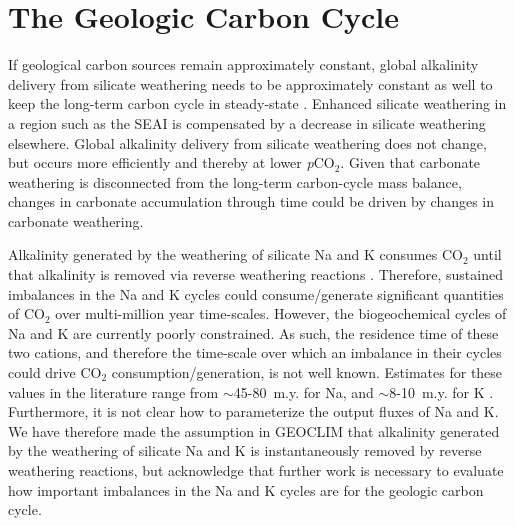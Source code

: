 \documentclass[9pt,twocolumn,twoside,lineno]{pnas-new}
\newcommand{\pCOtwo}{\textit{p}CO$_{2}$\xspace}
\newcommand{\COtwo}{CO$_{2}$\xspace}
\begin{document}
\section*{The Geologic Carbon Cycle}

If geological carbon sources remain approximately constant, global alkalinity delivery from silicate weathering needs to be approximately constant as well to keep the long-term carbon cycle in steady-state \cite{Kump1997a}. Enhanced silicate weathering in a region such as the SEAI is compensated by a decrease in silicate weathering elsewhere. Global alkalinity delivery from silicate weathering does not change, but occurs more efficiently and thereby at lower \pCOtwo. Given that carbonate weathering is disconnected from the long-term carbon-cycle mass balance, changes in carbonate accumulation through time \cite{Si2019a} could be driven by changes in carbonate weathering.

Alkalinity generated by the weathering of silicate Na and K consumes \COtwo until that alkalinity is removed via reverse weathering reactions \cite{Sun2016a}. Therefore, sustained imbalances in the Na and K cycles could consume/generate significant quantities of \COtwo over multi-million year time-scales. However, the biogeochemical cycles of Na and K are currently poorly constrained. As such, the residence time of these two cations, and therefore the time-scale over which an imbalance in their cycles could drive \COtwo consumption/generation, is not well known. Estimates for these values in the literature range from $\sim$45-80~m.y. for Na, and $\sim$8-10~m.y. for K \cite{Emerson2008a, Lecuyer2016a}. Furthermore, it is not clear how to parameterize the output fluxes of Na and K. We have therefore made the assumption in GEOCLIM that alkalinity generated by the weathering of silicate Na and K is instantaneously removed by reverse weathering reactions, but acknowledge that further work is necessary to evaluate how important imbalances in the Na and K cycles are for the geologic carbon cycle.
\end{document}
